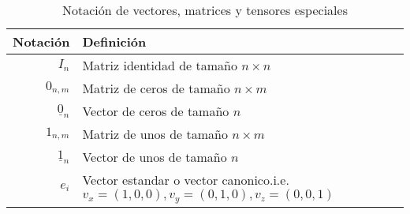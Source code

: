 \begin{table}[H]
    \begin{center}
        \begin{tabularx}{\textwidth}{|r|X|}
            \hline
            \textbf{Notación}     & \textbf{Definición}                                                                                                  \\
            \hline

            $ I_{n} $             & Matriz identidad de tamaño $ n \times n $                                                                            \\
            $ 0_{n,m} $           & Matriz de ceros de tamaño $ n \times m $                                                                             \\
            $ \underline{0}_{n} $ & Vector de ceros de tamaño $ n $                                                                                      \\
            $ 1_{n,m} $           & Matriz de unos de tamaño $ n \times m $                                                                              \\
            $ \underline{1}_{n} $ & Vector de unos de tamaño $n $                                                                                        \\
            $ e_{i} $             & Vector estandar o vector canonico.\newline i.e. \scriptsize{${ v_{x} = (1,0,0), v_{y} = (0,1,0), v_{z} = (0,0,1)} $} \\
            \hline
        \end{tabularx}
        \caption{Notación de vectores, matrices y tensores especiales}
        \label{tab:notation-part-v-2}
    \end{center}
\end{table}




